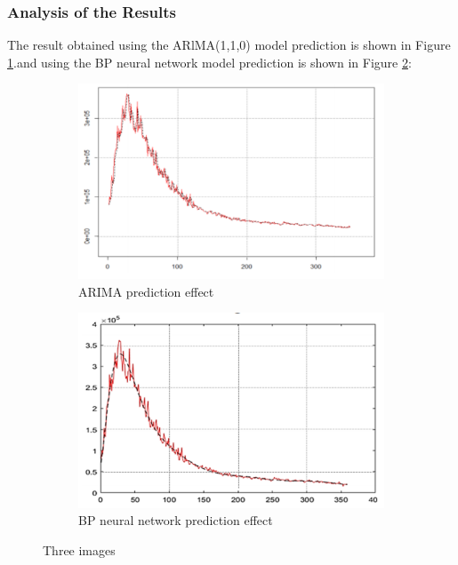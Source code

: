 \documentclass[12pt]{ctexart}
\begin{document}
\subsubsection{Analysis of the Results}
The result obtained using the ARlMA(1,1,0) model prediction is shown in Figure \ref{fg:5}.and using the BP neural network model prediction is shown in Figure \ref{fg:6}:
\begin{figure}[!htbp]
	\centering
	\begin{subfigure}[t]{0.4\textwidth}
		\centering
		\includegraphics[width=\textwidth]{1706018588496.png}
		\caption{ARIMA prediction effect}
		\label{fg:5}
	\end{subfigure}
	\begin{subfigure}[t]{0.4\textwidth}
		\centering
		\includegraphics[width=\textwidth]{1706018630565.png}
		\caption{BP neural network prediction effect}
		\label{fg:6}
	\end{subfigure}
	\caption{Three images}
	\label{Three images}
\end{figure}
\end{document}
